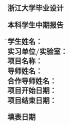 
  \DeclareRobustCommand{\zjulabnamec}{}
  \DeclareRobustCommand{\zjustarttime}{}
  \DeclareRobustCommand{\zjuendtime}{}
  \DeclareRobustCommand{\zjufilldate}{ 年 月 日}

\thispagestyle{empty}

\vspace{40mm}

\centerline{\songti\erhao\textbf{浙江大学毕业设计}}
\vspace{20mm}
\centerline{\heiti\erhao\textbf{本科学生中期报告}}
\vspace{20mm}

\begin{tabbing}
               \hspace{10mm} \= \songti\sihao\bf 学生姓名：\quad \quad \quad \quad \= \underline{\makebox[8cm]{\sihao\bf\zjuauthornamec}} \\[2mm]
              \> \songti\sihao\bf 实习单位/实验室： \> \underline{\makebox[8cm]{\sihao\bf\zjulabnamec}} \\[2mm]
              \> \songti\sihao\bf 项目名称： \> \underline{\makebox[8cm]{\sihao\bf\zjutitlec}} \\[2mm]
              \> \songti\sihao\bf 导师姓名： \> \underline{\makebox[8cm]{\sihao\bf\zjumentorc}} \\[2mm]
              \> \songti\sihao\bf 合作导师姓名： \> \underline{\makebox[8cm]{\sihao\bf\zjumentorc}} \\[2mm]
              \> \songti\sihao\bf 项目开始日期： \> \underline{\makebox[8cm]{\sihao\bf\zjustarttime}} \\[2mm]
              \> \songti\sihao\bf 项目结束日期： \> \underline{\makebox[8cm]{\sihao\bf\zjuendtime}} \\[2mm]
\end{tabbing}

\begin{flushright}
    \sihao\bf\textbf{填表日期}{\makebox[4cm]{\zjufilldate}} \\[2mm]
\end{flushright}
